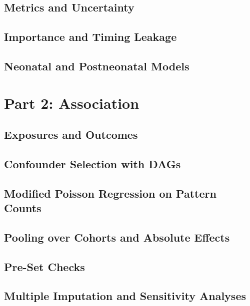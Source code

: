 \subsection{Metrics and Uncertainty}
\subsection{Importance and Timing Leakage}
\subsection{Neonatal and Postneonatal Models}

\section{Part 2: Association}
\subsection{Exposures and Outcomes}
\subsection{Confounder Selection with DAGs}
\subsection{Modified Poisson Regression on Pattern Counts}
\subsection{Pooling over Cohorts and Absolute Effects}
\subsection{Pre-Set Checks}
\subsection{Multiple Imputation and Sensitivity Analyses}

